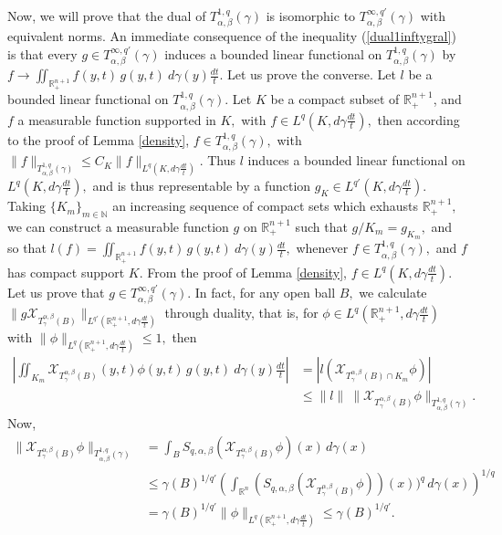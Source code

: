 \documentclass[leqno,11pt]{amsart}
\theoremstyle{plain}
\theoremstyle{remark}
\begin{document}
{Now, we will prove that the dual of $T^{1,q}_{\alpha,\beta}(\gamma)$ is isomorphic to $T^{\infty, q'}_{\alpha, \beta}(\gamma)$ with equivalent norms. An immediate consequence of the inequality (\ref{dual1inftygral}) is that every $g\in T^{\infty, q'}_{\alpha, \beta}(\gamma)$ induces a bounded linear functional on $T^{1,q}_{\alpha, \beta}(\gamma)$ by $f\to \iint_{\mathbb{R}^{n+1}_+}f(y,t)\, g(y,t)\ d\gamma(y)\frac{dt}{t}$. Let us prove the converse. Let $l$ be a bounded linear functional on $T^{1,q}_{\alpha, \beta}(\gamma).$ Let $K$ be a compact subset of $\mathbb{R}^{n+1}_+$, and $f$  a measurable function supported in $K,$ with $f\in L^q(K, d\gamma\frac{dt}{t}),$ then according to the proof of Lemma \ref{density}, $f\in T^{1,q}_{\alpha, \beta}(\gamma),$ with $\|f\|_{T^{1,q}_{\alpha, \beta}(\gamma)}\le C_K \|f\|_{L^q(K, d\gamma\frac{dt}{t})}.$ Thus $l$ induces a bounded linear functional on $L^q(K,d\gamma\frac{dt}{t}),$ and is thus representable by a function $g_K\in L^{q'}(K, d\gamma\frac{dt}{t}).$ Taking $\{K_m\}_{m\in {\mathbb N}}$ an increasing sequence of compact sets which exhausts $\mathbb{R}^{n+1}_+,$ we can construct a measurable function $g$ on $\mathbb{R}^{n+1}_+$ such that $g/K_m = g_{K_m},$ and so that $l(f)=\iint_{\mathbb{R}^{n+1}_+}f(y,t)\, g(y,t)\ d\gamma(y)\frac{dt}{t},$ whenever $f\in T^{1,q}_{\alpha, \beta}(\gamma),$ and $f$ has compact support $K.$ From the proof of Lemma \ref{density}, 
$f\in L^{q}(K,d\gamma\frac{dt}{t})$. Let us prove that $g\in T^{\infty, q'}_{\alpha, \beta}(\gamma).$ In fact, for any open ball $B,$ we calculate $\|g\mathcal{X}_{T^{\alpha, \beta}_\gamma (B)}\|_{L^{q'}(\mathbb{R}^{n+1}_+,d\gamma\frac{dt}{t})}$ through duality, that is, for $\phi\in L^{q}(\mathbb{R}^{n+1}_+,d\gamma\frac{dt}{t})$ with $\|\phi\|_{L^q(\mathbb{R}^{n+1}_+, d\gamma \frac{dt}{t})}\le 1,$ then  \begin{align*}
\left| \iint_{K_m} \mathcal{X}_{T^{\alpha, \beta}_\gamma(B)}(y,t)\phi(y,t)\, g(y,t)\ d\gamma(y)\frac{dt}{t}\right|&= |l(\mathcal{X}_{T^{\alpha,\beta}_\gamma (B)\cap K_m} \phi)|\\ &\le \|l\|\ \|\mathcal{X}_{T^{\alpha, \beta}_\gamma (B)} \phi\|_{T^{1,q}_{\alpha, \beta}(\gamma)}. 
\end{align*}
Now, 
\begin{align*}\|\mathcal{X}_{T^{\alpha, \beta}_\gamma(B)}\phi\|_{T^{1,q}_{\alpha, \beta}(\gamma)}&=\int_{B}S_{q,\alpha,\beta}(\mathcal{X}_{T^{\alpha, \beta}_\gamma (B)}\phi)(x)\, d\gamma(x) \\ & \le \gamma(B)^{1/q'}\left(\int_{\mathbb{R}^n} (S_{q,\alpha, \beta}(\mathcal{X}_{T^{\alpha, \beta}_\gamma(B)} \phi))(x))^q\, d\gamma(x)\right)^{1/q}\\ & = \gamma(B)^{1/q'} \|\phi\|_{L^{q}(\mathbb{R}^{n+1}_+, d\gamma\frac{dt}{t})}\le \gamma(B)^{1/q'}.

\end{align*}}
\end{document}
